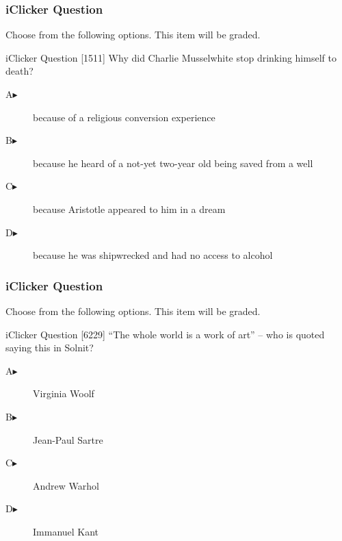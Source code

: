 \documentclass[xcolor=dvipsnames]{beamer}
\begin{document}
\begin{frame}
  \frametitle{iClicker Question}
Choose from the following options. This item will be graded.
\begin{block}{iClicker Question}
[1511] Why did Charlie Musselwhite stop drinking himself to death?
\end{block}
\begin{description}
\item[A\hspace{.2in}$\blacktriangleright$] because of a religious
  conversion experience
\item[B\hspace{.2in}$\blacktriangleright$] because he heard of a
  not-yet two-year old being saved from a well
\item[C\hspace{.2in}$\blacktriangleright$] because Aristotle
  appeared to him in a dream
\item[D\hspace{.2in}$\blacktriangleright$] because he was shipwrecked
  and had no access to alcohol
\end{description}
\end{frame}


\begin{frame}
  \frametitle{iClicker Question}
Choose from the following options. This item will be graded.
\begin{block}{iClicker Question}
[6229] ``The whole world is a work of art'' -- who is quoted saying this in Solnit?
\end{block}
\begin{description}
\item[A\hspace{.2in}$\blacktriangleright$] Virginia Woolf
\item[B\hspace{.2in}$\blacktriangleright$] Jean-Paul Sartre
\item[C\hspace{.2in}$\blacktriangleright$] Andrew Warhol
\item[D\hspace{.2in}$\blacktriangleright$] Immanuel Kant
\end{description}
\end{frame}
\end{document}
